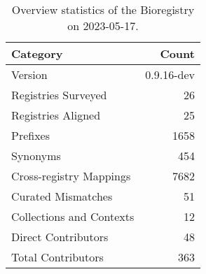 \begin{table}
\caption{Overview statistics of the Bioregistry on 2023-05-17.}
\label{tab:bioregistry-summary}
\begin{tabular}{lr}
\toprule
Category & Count \\
\midrule
Version & 0.9.16-dev \\
Registries Surveyed & 26 \\
Registries Aligned & 25 \\
Prefixes & 1658 \\
Synonyms & 454 \\
Cross-registry Mappings & 7682 \\
Curated Mismatches & 51 \\
Collections and Contexts & 12 \\
Direct Contributors & 48 \\
Total Contributors & 363 \\
\bottomrule
\end{tabular}
\end{table}
